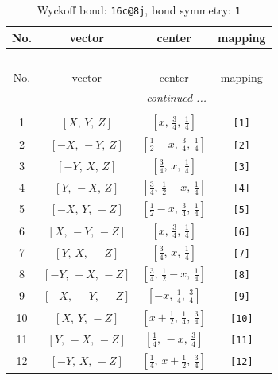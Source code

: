 \documentclass[fleqn,8pt]{jsarticle}
\begin{document}
\begin{longtable}{cccc}
\caption{Wyckoff bond: {\tt 16c@8j}, bond symmetry: {\tt 1}}
 \\
 \hline \hline
No. & vector & center & mapping \\ \hline \endfirsthead

\multicolumn{3}{l}{\tablename\ \thetable{}} \\
 \hline \hline
No. & vector & center & mapping \\ \hline \endhead

 \hline \hline
\multicolumn{3}{r}{\footnotesize\it continued ...} \\ \endfoot

 \hline \hline
\multicolumn{3}{r}{} \\ \endlastfoot

1 & $\left[ X,\, Y,\, Z \right]$ & $\left[ x,\, \frac{3}{4},\, \frac{1}{4} \right]$ & {\tt [1]} \\ \hline
2 & $\left[ - X,\, - Y,\, Z \right]$ & $\left[ \frac{1}{2} - x,\, \frac{3}{4},\, \frac{1}{4} \right]$ & {\tt [2]} \\ \hline
3 & $\left[ - Y,\, X,\, Z \right]$ & $\left[ \frac{3}{4},\, x,\, \frac{1}{4} \right]$ & {\tt [3]} \\ \hline
4 & $\left[ Y,\, - X,\, Z \right]$ & $\left[ \frac{3}{4},\, \frac{1}{2} - x,\, \frac{1}{4} \right]$ & {\tt [4]} \\ \hline
5 & $\left[ - X,\, Y,\, - Z \right]$ & $\left[ \frac{1}{2} - x,\, \frac{3}{4},\, \frac{1}{4} \right]$ & {\tt [5]} \\ \hline
6 & $\left[ X,\, - Y,\, - Z \right]$ & $\left[ x,\, \frac{3}{4},\, \frac{1}{4} \right]$ & {\tt [6]} \\ \hline
7 & $\left[ Y,\, X,\, - Z \right]$ & $\left[ \frac{3}{4},\, x,\, \frac{1}{4} \right]$ & {\tt [7]} \\ \hline
8 & $\left[ - Y,\, - X,\, - Z \right]$ & $\left[ \frac{3}{4},\, \frac{1}{2} - x,\, \frac{1}{4} \right]$ & {\tt [8]} \\ \hline
9 & $\left[ - X,\, - Y,\, - Z \right]$ & $\left[ - x,\, \frac{1}{4},\, \frac{3}{4} \right]$ & {\tt [9]} \\ \hline
10 & $\left[ X,\, Y,\, - Z \right]$ & $\left[ x + \frac{1}{2},\, \frac{1}{4},\, \frac{3}{4} \right]$ & {\tt [10]} \\ \hline
11 & $\left[ Y,\, - X,\, - Z \right]$ & $\left[ \frac{1}{4},\, - x,\, \frac{3}{4} \right]$ & {\tt [11]} \\ \hline
12 & $\left[ - Y,\, X,\, - Z \right]$ & $\left[ \frac{1}{4},\, x + \frac{1}{2},\, \frac{3}{4} \right]$ & {\tt [12]} \\ \hline

\end{longtable}
\end{document}

